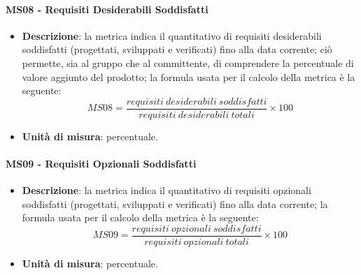 		\paragraph{MS08 - Requisiti Desiderabili Soddisfatti}
		\begin{itemize}
			\item \textbf{Descrizione}: la metrica indica il quantitativo di requisiti desiderabili soddisfatti (progettati, sviluppati e verificati) fino alla data corrente; ciò permette, sia al gruppo che al committente, di comprendere la percentuale di valore aggiunto del prodotto; la formula usata per il calcolo della metrica è la seguente:
            \[
            MS08 = \frac{requisiti\ desiderabili\ soddisfatti}{requisiti\ desiderabili\ totali} \times 100
            \]
			\item \textbf{Unità di misura}: percentuale.
		\end{itemize}

		\paragraph{MS09 - Requisiti Opzionali Soddisfatti}
		\begin{itemize}
			\item \textbf{Descrizione}: la metrica indica il quantitativo di requisiti opzionali soddisfatti (progettati, sviluppati e verificati) fino alla data corrente; la formula usata per il calcolo della metrica è la seguente:
            \[
            MS09 = \frac{requisiti\ opzionali\ soddisfatti}{requisiti\ opzionali\ totali} \times 100
            \]
			\item \textbf{Unità di misura}: percentuale.
		\end{itemize}